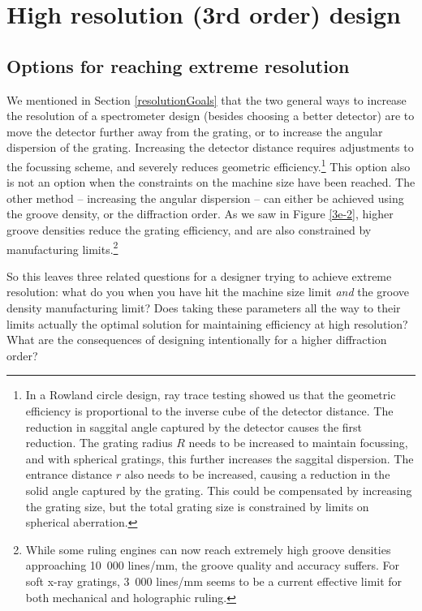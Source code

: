 \section{High resolution (3rd order) design}
\label{3rdOrderDesign}
\subsection{Options for reaching extreme resolution}
We mentioned in Section \ref{resolutionGoals} that the two general ways to increase the resolution of a spectrometer design (besides choosing a better detector) are to move the detector further away from the grating, or to increase the angular dispersion of the grating.  Increasing the detector distance requires adjustments to the focussing scheme, and severely reduces geometric efficiency.\footnote{In a Rowland circle design, ray trace testing \cite{Mui06} showed us that the geometric efficiency is proportional to the inverse cube of the detector distance. The reduction in saggital angle captured by the detector causes the first reduction. The grating radius $R$ needs to be increased to maintain focussing,  and with spherical gratings, this further increases the saggital dispersion.  The entrance distance $r$ also needs to be increased, causing a reduction in the solid angle captured by the grating. This could be compensated by increasing the grating size, but the total grating size is constrained by limits on spherical aberration.}  This option also is not an option when the constraints on the machine size have been reached.  The other method -- increasing the angular dispersion -- can either be achieved using the groove density, or the diffraction order.  As we saw in Figure \ref{3e-2}, higher groove densities reduce the grating efficiency, and are also constrained by manufacturing limits.\footnote{While some ruling engines can now reach extremely high groove densities approaching 10~000 lines/mm, the groove quality and accuracy suffers.  For soft x-ray gratings, 3~000 lines/mm seems to be a current effective limit for both mechanical and holographic ruling.}

So this leaves three related questions for a designer trying to achieve extreme resolution: what do you when you have hit the machine size limit \emph{and} the groove density manufacturing limit? Does taking these parameters all the way to their limits actually the optimal solution for maintaining efficiency at high resolution?  What are the consequences of designing intentionally for a higher diffraction order?

